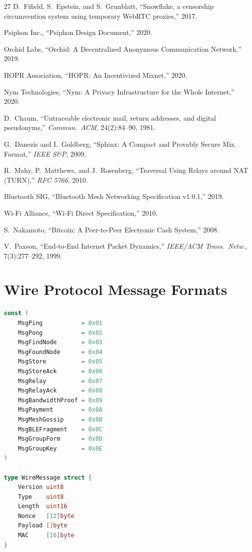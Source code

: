 \documentclass[11pt,a4paper]{article}
\begin{document}
\begin{thebibliography}{27}
D.~Fifield, S.~Epstein, and S.~Grunblatt,
``Snowflake, a censorship circumvention system using temporary WebRTC proxies,''
2017.

Psiphon Inc.,
``Psiphon Design Document,''
2020.

Orchid Labs,
``Orchid: A Decentralized Anonymous Communication Network,''
2019.

HOPR Association,
``HOPR: An Incentivized Mixnet,''
2020.

Nym Technologies,
``Nym: A Privacy Infrastructure for the Whole Internet,''
2020.

D.~Chaum,
``Untraceable electronic mail, return addresses, and digital pseudonyms,''
\emph{Commun.\ ACM}, 24(2):84--90, 1981.

G.~Danezis and I.~Goldberg,
``Sphinx: A Compact and Provably Secure Mix Format,''
\emph{IEEE S\&P}, 2009.

R.~Mahy, P.~Matthews, and J.~Rosenberg,
``Traversal Using Relays around NAT (TURN),''
\emph{RFC 5766}, 2010.

Bluetooth SIG,
``Bluetooth Mesh Networking Specification v1.0.1,''
2019.

Wi-Fi Alliance,
``Wi-Fi Direct Specification,''
2010.

S.~Nakamoto,
``Bitcoin: A Peer-to-Peer Electronic Cash System,''
2008.

V.~Paxson,
``End-to-End Internet Packet Dynamics,''
\emph{IEEE/ACM Trans.\ Netw.}, 7(3):277--292, 1999.

\end{thebibliography}

\appendix

\section{Wire Protocol Message Formats}
\label{app:wire}

\begin{lstlisting}[language=Go,caption={Wire Protocol Constants}]
const (
    MsgPing           = 0x01
    MsgPong           = 0x02
    MsgFindNode       = 0x03
    MsgFoundNode      = 0x04
    MsgStore          = 0x05
    MsgStoreAck       = 0x06
    MsgRelay          = 0x07
    MsgRelayAck       = 0x08
    MsgBandwidthProof = 0x09
    MsgPayment        = 0x0A
    MsgMeshGossip     = 0x0B
    MsgBLEFragment    = 0x0C
    MsgGroupForm      = 0x0D
    MsgGroupKey       = 0x0E
)

type WireMessage struct {
    Version uint8
    Type    uint8
    Length  uint16
    Nonce   [12]byte
    Payload []byte
    MAC     [16]byte
}
\end{lstlisting}
\end{document}
